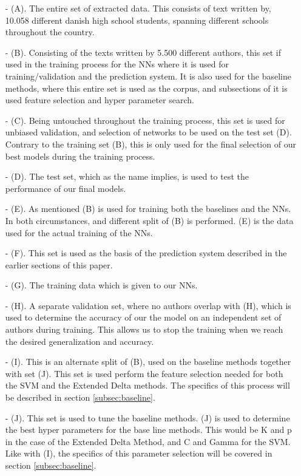 \begin{itemize}

\item[- (A).] The entire set of extracted data. This consists of text written
by, 10.058 different danish high school students, spanning different schools
throughout the country.

\item[- (B).] Consisting of the texts written by 5.500 different authors, this
set if used in the training process for the \gls{NN}s where it is used for
training/validation and the prediction system. It is also used for the baseline
methods, where this entire set is used as the corpus, and subsections of it is
used feature selection and hyper parameter search.

\item[- (C).]
Being untouched throughout the training process, this set is used for unbiased
validation, and selection of networks to be used on the test set (D). Contrary
to the training set (B), this is only used for the final selection of our best 
models during the training process.

\item[- (D).]
The test set, which as the name implies, is used to test the
performance of our final models.

\item[- (E).] As mentioned (B) is used for training both the baselines and the 
\gls{NN}s. In both circumstances, and different split of (B) is performed.
(E) is the data used for the actual training of the \gls{NN}s.

\item[- (F).] This set is used as the basis of the prediction system described
in the earlier sections of this paper.

\item[- (G).] The training data which is given to our \gls{NN}s.

\item[- (H).] A separate validation set, where no authors overlap with (H),
which is used to determine the accuracy of our the model on an independent set
of authors during training. This allows us to stop the training when we reach
the desired generalization and accuracy.

\item[- (I).] This is an alternate split of (B), used on the baseline methods
together with set (J). This set is used perform the feature selection needed for
both the SVM and the Extended Delta methods. The specifics of this process will
be described in section \ref{subsec:baseline}.

\item[- (J).] This set is used to tune the baseline methods. (J) is used to
determine the best hyper parameters for the base line methods. This would be K
and p in the case of the Extended Delta Method, and C and Gamma for the SVM.
Like with (I), the specifics of this parameter selection will be covered in
section \ref{subsec:baseline}.


\end{itemize}


